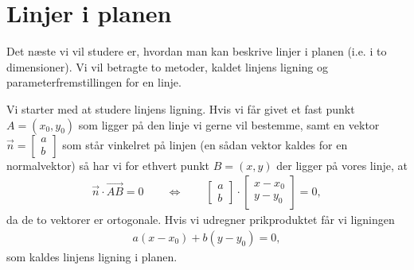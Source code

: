 \section{Linjer i planen}
\noindent Det næste vi vil studere er, hvordan man kan beskrive linjer i planen (i.e. i to dimensioner). Vi vil betragte to metoder, kaldet linjens ligning og parameterfremstillingen for en linje.

Vi starter med at studere linjens ligning. Hvis vi får givet et fast punkt $A=(x_0,y_0)$ som ligger på den linje vi gerne vil bestemme, samt en vektor $\vec{n}=\begin{bmatrix}a \\ b\end{bmatrix}$ som står vinkelret på linjen (en sådan vektor kaldes for en normalvektor) så har vi for ethvert punkt $B=(x,y)$ der ligger på vores linje, at
\begin{align*}
\vec{n} \cdot \overrightarrow{AB} = 0 \qquad \Leftrightarrow \qquad \begin{bmatrix}a \\ b\end{bmatrix} \cdot \begin{bmatrix} x - x_0 \\ y - y_0 \end{bmatrix} =0,
\end{align*}
da de to vektorer er ortogonale. Hvis vi udregner prikproduktet får vi ligningen
\begin{align}\label{eq:vec2d2et}
a(x-x_0) + b(y-y_0) = 0,
\end{align}
som kaldes linjens ligning i planen.

